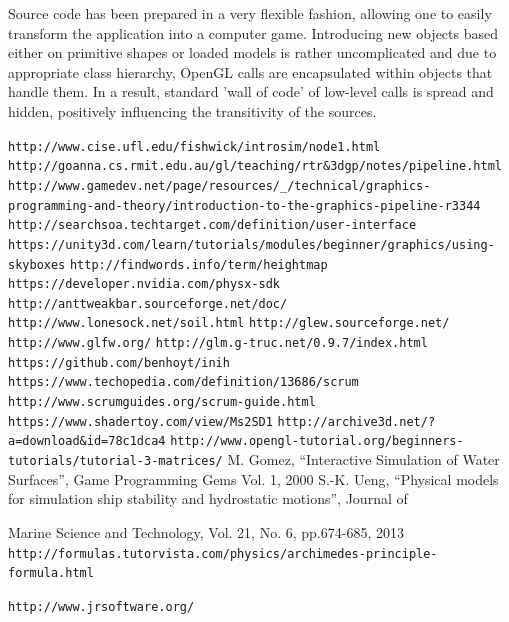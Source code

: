 \documentclass{report}
\begin{document}
Source code has been prepared in a very flexible fashion, allowing one to easily transform the application into a computer game. Introducing new objects based either on primitive shapes or loaded models is rather uncomplicated and due to appropriate class hierarchy, OpenGL calls are encapsulated within objects that handle them. In a result, standard 'wall of code' of low-level calls is spread and hidden, positively influencing the transitivity of the sources.



\begin{thebibliography}{1}
 \texttt{http://www.cise.ufl.edu/fishwick/introsim/node1.html}
 \texttt{http://goanna.cs.rmit.edu.au/gl/teaching/rtr\&3dgp/notes/pipeline.html}
 \texttt{http://www.gamedev.net/page/resources/\_/technical/graphics-programming-and-theory/introduction-to-the-graphics-pipeline-r3344}
 \texttt{http://searchsoa.techtarget.com/definition/user-interface}
 \texttt{https://unity3d.com/learn/tutorials/modules/beginner/graphics/using-skyboxes}
 \texttt{http://findwords.info/term/heightmap}
 \texttt{https://developer.nvidia.com/physx-sdk}
 \texttt{http://anttweakbar.sourceforge.net/doc/}
 \texttt{http://www.lonesock.net/soil.html}
 \texttt{http://glew.sourceforge.net/}
 \texttt{http://www.glfw.org/}
 \texttt{http://glm.g-truc.net/0.9.7/index.html}
 \texttt{https://github.com/benhoyt/inih}
 \texttt{https://www.techopedia.com/definition/13686/scrum}
 \texttt{http://www.scrumguides.org/scrum-guide.html}
 \texttt{https://www.shadertoy.com/view/Ms2SD1}
 \texttt{http://archive3d.net/?a=download\&id=78c1dca4}
 \texttt{http://www.opengl-tutorial.org/beginners-tutorials/tutorial-3-matrices/}
 M. Gomez, “Interactive Simulation of Water Surfaces”, Game Programming Gems Vol. 1, 2000
 S.-K. Ueng, “Physical models for simulation ship stability and hydrostatic motions”, Journal of

Marine Science and Technology, Vol. 21, No. 6, pp.674-685, 2013
 \texttt{http://formulas.tutorvista.com/physics/archimedes-principle-formula.html}

 \texttt{http://www.jrsoftware.org/}
\end{thebibliography}
\end{document}
